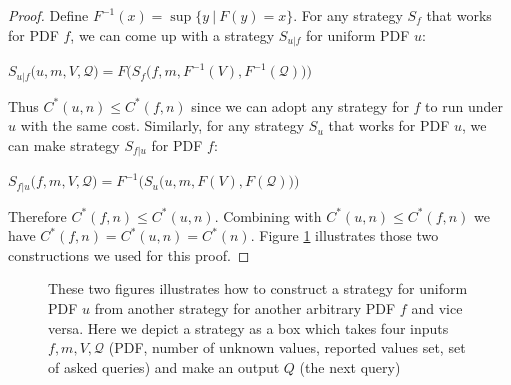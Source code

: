 \begin{proof}

Define $F^{-1}(x) = \sup\{y ~|~ F(y) = x\}$. For any strategy $S_f$ that works
for PDF $f$, we can come up with a strategy $S_{u|f}$ for uniform PDF $u$:

$
S_{u|f}\big(u, m, V, \mathcal Q \big) = F\Big( S_f\big( f, m, F^{-1}(V), F^{-1} (\mathcal Q) \big) \Big)
$

Thus $C^*(u, n) \leq C^*(f, n)$ since we can adopt any strategy for $f$ to run
under $u$ with the same cost.  Similarly, for any strategy $S_u$ that works for
PDF $u$, we can make strategy $S_{f|u}$ for PDF $f$:

$
S_{f|u}\big(f, m, V, \mathcal Q \big) = F^{-1}\Big( S_u\big( u, m, F(V), F (\mathcal Q) \big) \Big)
$

Therefore $C^*(f, n) \leq C^*(u, n)$. Combining with $C^*(u, n) \leq C^*(f, n)$
we have $C^*(f, n) = C^*(u, n) = C^*(n)$. Figure \ref{fig:uniform} 
illustrates those two constructions we used for this proof.

\end{proof}

\begin{figure}
\centering
  \caption{These two figures illustrates how to construct a strategy for
  uniform PDF $u$ from another strategy for another arbitrary PDF $f$ and vice
  versa. Here we depict a strategy as a box which takes four inputs $f, m, V,
  \mathcal Q$ (PDF, number of unknown values, reported values set, set of asked
  queries) and make an output $Q$ (the next query)} \label{fig:uniform}
\end{figure}

